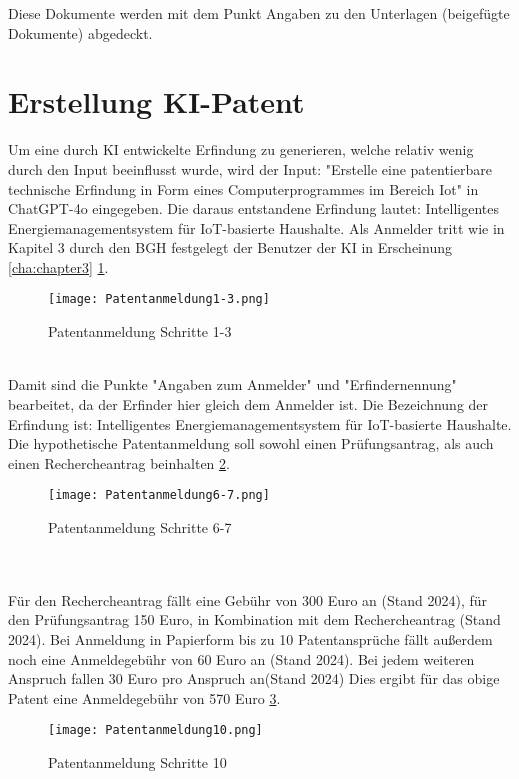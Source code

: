 Diese Dokumente werden mit dem Punkt Angaben 
zu den Unterlagen (beigefügte Dokumente) abgedeckt.

\section{Erstellung KI-Patent}

Um eine durch KI entwickelte Erfindung zu generieren, 
welche relativ wenig durch den Input beeinflusst wurde, 
wird der Input:
"Erstelle eine patentierbare technische Erfindung 
in Form eines Computerprogrammes im Bereich Iot" in ChatGPT-4o eingegeben.
Die daraus entstandene Erfindung lautet:
Intelligentes Energiemanagementsystem für \gls{IoT}-basierte Haushalte.
Als Anmelder tritt wie in Kapitel 3 durch den BGH festgelegt der Benutzer
der KI in Erscheinung \ref{cha:chapter3} \ref{fig:Pat1-3}.
\begin{figure}[htb]
    \centering
    \texttt{[image: Patentanmeldung1-3.png]}\\
    \caption{ Patentanmeldung Schritte 1-3 }\label{fig:Pat1-3}
\end{figure}
\\
Damit sind die Punkte "Angaben zum Anmelder" und "Erfindernennung" bearbeitet, 
da der Erfinder hier gleich dem Anmelder ist.
Die Bezeichnung der Erfindung ist:
Intelligentes Energiemanagementsystem für IoT-basierte Haushalte.
Die hypothetische Patentanmeldung soll sowohl einen Prüfungsantrag, 
als auch einen Rechercheantrag beinhalten \ref{fig:Pat6-7}.
\begin{figure}[htb]
    \centering
    \texttt{[image: Patentanmeldung6-7.png]}\\
    \caption{ Patentanmeldung Schritte 6-7 }\label{fig:Pat6-7}
\end{figure}
\\
\\
Für den Rechercheantrag fällt eine Gebühr von 300 Euro an (Stand 2024),
für den Prüfungsantrag 150 Euro, in Kombination mit dem Rechercheantrag (Stand 2024).
Bei Anmeldung in Papierform bis zu 10 Patentansprüche fällt außerdem noch eine
Anmeldegebühr von 60 Euro an (Stand 2024). Bei jedem weiteren Anspruch
fallen 30 Euro pro Anspruch an(Stand 2024) Dies ergibt für das obige Patent 
eine Anmeldegebühr von 570 Euro \ref{fig:Pat10}.
\begin{figure}[htb]
    \centering
    \texttt{[image: Patentanmeldung10.png]}\\
    \caption{ Patentanmeldung Schritte 10 }\label{fig:Pat10}
\end{figure}

